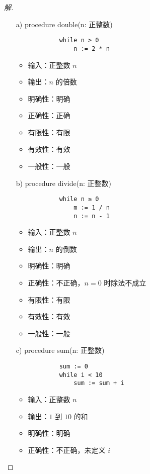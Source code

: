 \documentclass[UTF8]{report}
\theoremstyle{MyLineTheoremStyle} %
\theoremstyle{MyBlockTheoremStyle} %
\theoremstyle{MySubsubsectionStyle} %
\begin{document}
\begin{proof}[解]
    \begin{itemize}
        \item[a)] procedure double(n: 正整数)
        \begin{verbatim}
            while n > 0
                n := 2 * n
        \end{verbatim}
        \begin{itemize}
            \item 输入：正整数 $n$
            \item 输出：$n$ 的倍数
            \item 明确性：明确
            \item 正确性：正确
            \item 有限性：有限
            \item 有效性：有效
            \item 一般性：一般
        \end{itemize}
        \item[b)] procedure divide(n: 正整数)
        \begin{verbatim}
            while n ≥ 0
                m := 1 / n
                n := n - 1
        \end{verbatim}
        \begin{itemize}
            \item 输入：正整数 $n$
            \item 输出：$n$ 的倒数
            \item 明确性：明确
            \item 正确性：不正确，$n = 0$ 时除法不成立
            \item 有限性：有限
            \item 有效性：有效
            \item 一般性：一般
        \end{itemize}
        \item[c)] procedure sum(n: 正整数)
        \begin{verbatim}
            sum := 0
            while i < 10
                sum := sum + i
        \end{verbatim}
        \begin{itemize}
            \item 输入：正整数 $n$
            \item 输出：$1$ 到 $10$ 的和
            \item 明确性：明确
            \item 正确性：不正确，未定义 $i$

\end{itemize}
\end{itemize}
\end{proof}
\end{document}
